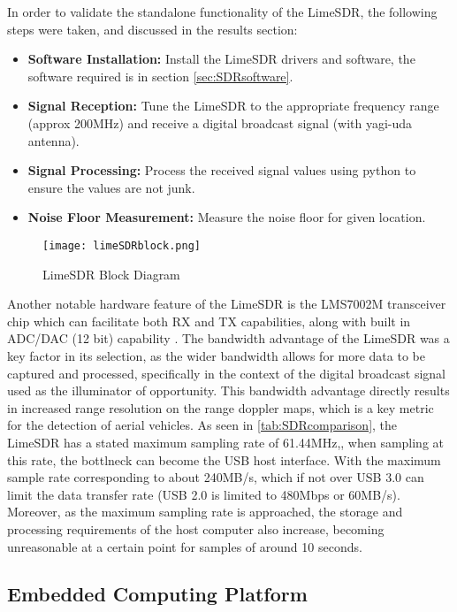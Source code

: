 In order to validate the standalone functionality of the LimeSDR, the following steps were taken, and discussed in the results section:
\begin{itemize}
    \item \textbf{Software Installation:} Install the LimeSDR drivers and software, the software required is in section \ref{sec:SDRsoftware}.
    \item \textbf{Signal Reception:} Tune the LimeSDR to the appropriate frequency range (approx 200MHz) and receive a digital broadcast signal (with yagi-uda antenna).
    \item \textbf{Signal Processing:} Process the received signal values using python to ensure the values are not junk.
    \item \textbf{Noise Floor Measurement:} Measure the noise floor for given location.
\end{itemize}

\begin{figure}[htbp]
    \centering
    \texttt{[image: limeSDRblock.png]}
    \caption{LimeSDR Block Diagram \cite{limesdr_usb}}
    \label{fig:limeSDRblock}
\end{figure}

Another notable hardware feature of the LimeSDR is the LMS7002M transceiver chip which can facilitate both RX and TX capabilities, along with built in ADC/DAC (12 bit) capability \cite{limesdr_usb}. The bandwidth advantage of the LimeSDR was a key factor in its selection, as the wider bandwidth allows for more data to be captured and processed, specifically in the context of the digital broadcast signal used as the illuminator of opportunity. This bandwidth advantage directly results in increased range resolution on the range doppler maps, which is a key metric for the detection of aerial vehicles. As seen in \ref{tab:SDRcomparison}, the LimeSDR has a stated maximum sampling rate of 61.44MHz,, when sampling at this rate, the bottlneck can become the USB host interface. With the maximum sample rate corresponding to about 240MB/s, which if not over USB 3.0 can limit the data transfer rate (USB 2.0 is limited to 480Mbps or 60MB/s). Moreover, as the maximum sampling rate is approached, the storage and processing requirements of the host computer also increase, becoming unreasonable at a certain point for samples of around 10 seconds.

\subsection{Embedded Computing Platform \label{sec:embedded computing}}


